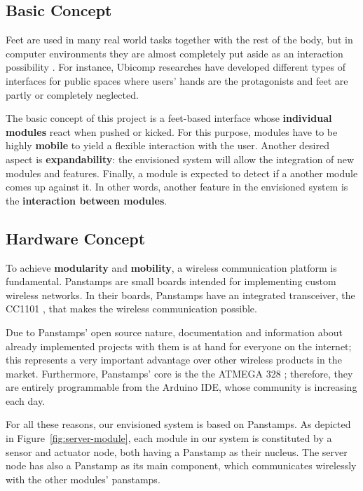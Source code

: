 \subsection{Basic Concept}
Feet are used in many real world tasks together with the rest of the body, but in computer environments they are almost completely put aside as an interaction possibility \cite{pakkanen}. For instance, Ubicomp researches have developed different types of interfaces for public spaces where users' hands are the protagonists and feet are partly or completely neglected. 

The basic concept of this project is a feet-based interface whose \textbf{individual modules} react when pushed or kicked. For this purpose, modules have to be highly \textbf {mobile} to yield a flexible interaction with the user. Another desired aspect is \textbf {expandability}: the envisioned system will allow the integration of new modules and features. Finally, a module is expected to detect if a another module comes up against it. In other words, another feature in the envisioned system is the \textbf{interaction between modules}. 

\subsection{Hardware Concept}
To achieve \textbf{modularity} and \textbf{mobility}, a wireless communication platform is fundamental.   
Panstamps \cite{panstamp} are small boards intended for implementing custom wireless networks. In their boards, Panstamps have an integrated transceiver, the CC1101 \cite{cc1101}, that makes the wireless communication possible. 

Due to Panstamps' open source nature, documentation and information about already implemented projects with them is at hand for everyone on the internet; this represents a very important advantage over other wireless products in the market. Furthermore, Panstamps' core is the the ATMEGA 328 \cite{atmega328}; therefore, they are entirely programmable from the Arduino IDE, whose community is increasing each day.

For all these reasons, our envisioned system is based on Panstamps. As depicted in Figure~\ref{fig:server-module}, each module in our system is constituted by a sensor and actuator node, both having a Panstamp as their nucleus. The server node has also a Panstamp as its main component, which communicates wirelessly with the other modules' panstamps. 

